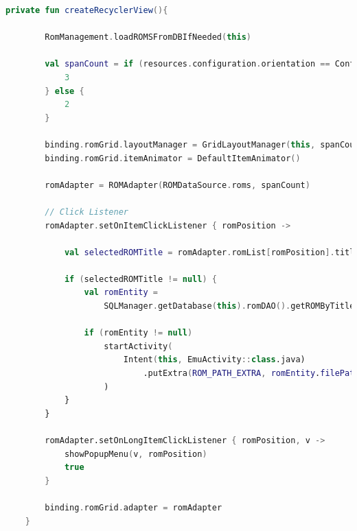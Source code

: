 \begin{lstlisting}[language=Kotlin, caption={MainActivity - Configuración del RecyclerView.}, label={code:activitymain}]
    private fun createRecyclerView(){

        RomManagement.loadROMSFromDBIfNeeded(this)

        val spanCount = if (resources.configuration.orientation == Configuration.ORIENTATION_LANDSCAPE) {
            3
        } else {
            2
        }

        binding.romGrid.layoutManager = GridLayoutManager(this, spanCount)
        binding.romGrid.itemAnimator = DefaultItemAnimator()

        romAdapter = ROMAdapter(ROMDataSource.roms, spanCount)

        // Click Listener
        romAdapter.setOnItemClickListener { romPosition ->

            val selectedROMTitle = romAdapter.romList[romPosition].title

            if (selectedROMTitle != null) {
                val romEntity =
                    SQLManager.getDatabase(this).romDAO().getROMByTitle(selectedROMTitle)

                if (romEntity != null)
                    startActivity(
                        Intent(this, EmuActivity::class.java)
                            .putExtra(ROM_PATH_EXTRA, romEntity.filePath)
                    )
            }
        }

        romAdapter.setOnLongItemClickListener { romPosition, v ->
            showPopupMenu(v, romPosition)
            true
        }

        binding.romGrid.adapter = romAdapter
    }
\end{lstlisting}

